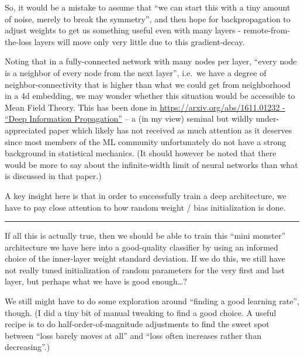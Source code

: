 \documentclass[11pt]{article}
\begin{document}
So, it would be a mistake to assume that ``we can start this with a tiny
amount of noise, merely to break the symmetry'', and then hope for
backpropagation to adjust weights to get us something useful even with
many layers - remote-from-the-loss layers will move only very little due
to this gradient-decay.

Noting that in a fully-connected network with many nodes per layer,
``every node is a neighbor of every node from the next layer'', i.e.~we
have a degree of neighbor-connectivity that is higher than what we could
get from neighborhood in a 4d embedding, we may wonder whether this
situation would be accessible to Mean Field Theory. This has been done
in
\href{https://arxiv.org/abs/1611.01232}{https://arxiv.org/abs/1611.01232
- ``Deep Information Propagation''} \cite{schoenholz2016deep} -- a (in my view) seminal but wildly
under-appreciated paper which likely has not received as much attention
as it deserves since most members of the ML community unfortunately do
not have a strong background in statistical mechanics. (It should
however be noted that there would be more to say about the
infinite-width limit of neural networks than what is discussed in that
paper.)

A key insight here is that in order to successfully train a deep
architecture, we have to pay close attention to how random weight / bias
initialization is done.

\begin{center}\rule{0.5\linewidth}{0.5pt}\end{center}

If all this is actually true, then we should be able to train this
``mini monster'' architecture we have here into a good-quality
classifier by using an informed choice of the inner-layer weight
standard deviation. If we do this, we still have not really tuned
initialization of random parameters for the very first and last layer,
but perhaps what we have is good enough\ldots?

We still might have to do some exploration around ``finding a good
learning rate'', though. (I did a tiny bit of manual tweaking to find a
good choice. A useful recipe is to do half-order-of-magnitude
adjustments to find the sweet spot between ``loss barely moves at all''
and ``loss often increases rather than decreasing''.)
\end{document}
